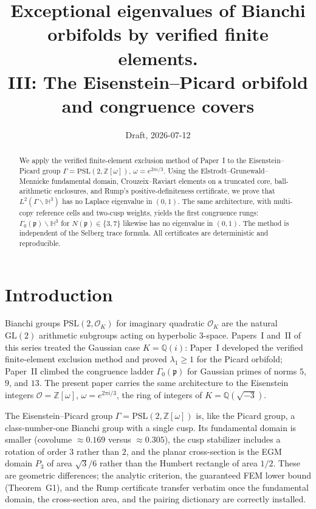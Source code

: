 \documentclass[11pt]{amsart}
\title[Verified exclusion for the Eisenstein--Picard orbifold]{Exceptional
eigenvalues of Bianchi orbifolds by verified finite elements.\\
III: The Eisenstein--Picard orbifold and congruence covers}
\author{}
\date{Draft, 2026-07-12}
\newcommand{\HH}{\mathbb{H}^3}
\newcommand{\ZZ}{\mathbb{Z}}
\newcommand{\PSL}{\mathrm{PSL}}
\newcommand{\p}{\mathfrak{p}}
\begin{document}
\begin{abstract}
We apply the verified finite-element exclusion method of Paper~I to the
Eisenstein--Picard group $\Gamma=\PSL(2,\ZZ[\omega])$, $\omega=e^{2\pi i/3}$.
Using the Elstrodt--Grunewald--Mennicke fundamental domain, Crouzeix--Raviart
elements on a truncated core, ball-arithmetic enclosures, and Rump's
positive-definiteness certificate, we prove that
$L^2(\Gamma\backslash\HH)$ has no Laplace eigenvalue in $(0,1)$.  The same
architecture, with multi-copy reference cells and two-cusp weights, yields
the first congruence rungs: $\Gamma_0(\p)\backslash\HH$ for
$N(\p)\in\{3,7\}$ likewise has no eigenvalue in $(0,1)$.  The method is
independent of the Selberg trace formula.  All certificates are
deterministic and reproducible.
\end{abstract}
\maketitle

\section{Introduction}

Bianchi groups $\PSL(2,\mathcal{O}_K)$ for imaginary quadratic
$\mathcal{O}_K$ are the natural $\mathrm{GL}(2)$ arithmetic subgroups
acting on hyperbolic $3$-space.  Papers~I and~II of this series treated
the Gaussian case $K=\mathbb{Q}(i)$: Paper~I developed the verified
finite-element exclusion method and proved $\lambda_1\ge 1$ for the Picard
orbifold; Paper~II climbed the congruence ladder
$\Gamma_0(\p)$ for Gaussian primes of norms $5$, $9$, and $13$.  The
present paper carries the same architecture to the Eisenstein integers
$\mathcal{O}=\ZZ[\omega]$, $\omega=e^{2\pi i/3}$, the ring of integers of
$K=\mathbb{Q}(\sqrt{-3})$.

The Eisenstein--Picard group $\Gamma=\PSL(2,\ZZ[\omega])$ is, like the
Picard group, a class-number-one Bianchi group with a single cusp.  Its
fundamental domain is smaller (covolume $\approx 0.169$ versus
$\approx 0.305$), the cusp stabilizer includes a rotation of order $3$
rather than $2$, and the planar cross-section is the EGM domain $P_3$ of
area $\sqrt{3}/6$ rather than the Humbert rectangle of area $1/2$.  These
are geometric differences; the analytic criterion, the guaranteed FEM
lower bound (Theorem~G1), and the Rump certificate transfer verbatim once
the fundamental domain, the cross-section area, and the pairing dictionary
are correctly installed.
\end{document}
